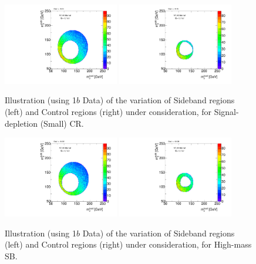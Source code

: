 \begin{figure}[htbp!]
\begin{center}
\includegraphics[width=0.45\textwidth,angle=-90]{figures/boosted/Syst_CRSB/CR_Small_Sideband_OneTag_mH0H1.pdf}
\includegraphics[width=0.45\textwidth,angle=-90]{figures/boosted/Syst_CRSB/CR_Small_Control_OneTag_mH0H1.pdf}\\
\end{center}
\caption{Illustration (using 1$b$ Data) of the variation of Sideband regions (left) and Control regions (right) under consideration, for Signal-depletion (Small) CR.}
\label{CRSB:CR_Small}
\end{figure}

\begin{figure}[htbp!]
\begin{center}
\includegraphics[width=0.45\textwidth,angle=-90]{figures/boosted/Syst_CRSB/SB_High_Sideband_OneTag_mH0H1.pdf}
\includegraphics[width=0.45\textwidth,angle=-90]{figures/boosted/Syst_CRSB/SB_High_Control_OneTag_mH0H1.pdf}\\
\end{center}
\caption{Illustration (using 1$b$ Data) of the variation of Sideband regions (left) and Control regions (right) under consideration, for High-mass SB.}
\label{CRSB:SB_High}
\end{figure}

